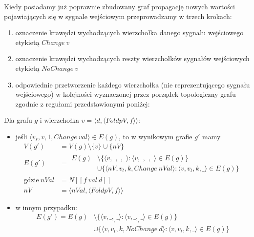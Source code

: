 \documentclass[11pt,leqno]{article}
\begin{document}
Kiedy posiadamy już poprawnie zbudowany graf propagację nowych wartości pojawiających się w sygnale wejściowym przeprowadzamy w trzech krokach:
\begin{enumerate}
\item oznaczenie krawędzi wychodzących wierzchołka danego sygnału wejściowego etykietą $Change\:v$
\item oznaczenie krawędzi wychodzących reszty wierzchołków sygnałów wejściowych etykietą $NoChange\:v$ 
\item odpowiednie przetworzenie każdego wierzchołka (nie reprezentującego sygnału wejściowego) w kolejności wyznaczonej przez porządek topologiczny grafu zgodnie z regułami przedstawionymi poniżej:
\end{enumerate}

Dla grafu $g$ i wierzchołka $v = \langle d, \langle FoldpV,f \rangle \rangle$:
\begin{itemize}
\item jeśli $ \langle v_s , v, 1, Change\:val \rangle \in E(g) $, to w wynikowym grafie $g'$ mamy
\begin {align*}
V(g') &= V(g) \setminus \{ v \} \cup \{ nV \} \\
E(g') &= \begin{aligned} E(g) &\setminus \{ \langle v, \_, \_, \_ \rangle : \langle v, \_ , \_, \_ \rangle \in E(g) \} \\ 
&\cup \{ \langle nV, v_t, k, Change\: nVal \rangle : \langle v, v_t , k, \_ \rangle \in E(g) \} \end{aligned} \\
\text{gdzie} \: nVal &= N [\![f \: val \: d]\!] \\
nV &= \langle nVal , \langle FoldpV,f \rangle \rangle
\end{align*}
\item w innym przypadku:
\begin{align*}
E(g') = E(g) &\setminus \{ \langle v, \_, _, \_ \rangle : \langle v, \_ , _, \_ \rangle \in E(g) \} \\ 
&\cup \{ \langle v, v_t, k, NoChange\: d \rangle : \langle v, v_t , k, \_ \rangle \in E(g) \}
\end{align*}
\end{itemize}
\end{document}
